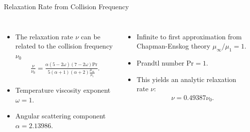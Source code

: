 \begin{frame}{Relaxation Rate from Collision Frequency}
  \begin{columns}
    \begin{itemize}
      \item The relaxation rate $\nu$ can be related to the collision frequency $\nu_0$ \cite{gallis2011investigation}
        \begin{align*}
          \frac{ \nu }{ \nu_0 }
          =
          \frac{
            \alpha \left( 5 - 2 \omega \right) \left( 7 - 2 \omega \right) \text{Pr}
          }{
            5 \left( \alpha + 1 \right) \left( \alpha + 2 \right) \frac{ \mu_\infty }{ \mu_1 }
          }.
        \end{align*}
      \item Temperature viscosity exponent $\omega = 1$.
      \item Angular scattering component $\alpha = 2.13986$.
    \end{itemize}
    \begin{itemize}
      \item Infinite to first approximation from Chapman-Enskog theory $\mu_\infty / \mu_1 = 1$.
      \item Prandtl number Pr$ = 1$.
      \item This yields an analytic relaxation rate $\nu$:
      \begin{align*}
        \nu = 0.49387 \nu_0.
      \end{align*}
    \end{itemize}
  \end{columns}
\end{frame}


